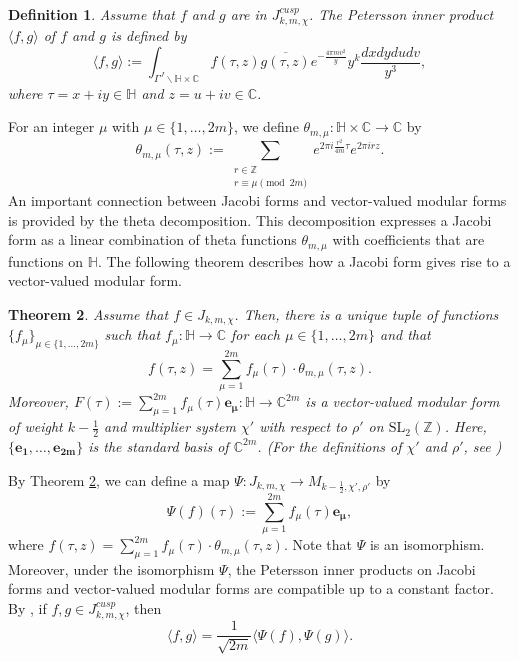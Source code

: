 \documentclass[11pt]{amsart}
\newtheorem{thm}{Theorem}[section]
\newtheorem{dfn}[thm]{Definition}
\theoremstyle{definition}
\theoremstyle{remark}
\numberwithin{equation}{section}
\renewcommand{\(}{\left(}
\renewcommand{\)}{\right)}
\def\ZZ{\mathbb{Z}}
\begin{document}
\begin{dfn}\label{def : def of Petersson inner product Jacobi}
Assume that $f$ and $g$ are in $J^{cusp}_{k,m,\chi}$. 
The Petersson inner product $\langle f, g \rangle$ of $f$ and $g$ is defined by 
\[ \langle f , g \rangle := \int_{\Gamma^{J}\backslash \mathbb{H}\times \mathbb{C}} f(\tau,z)\overline{g(\tau,z)} e^{-\frac{4\pi m v^2}{y}}y^{k} \frac{dxdydudv}{y^3},  \]
where $\tau=x+iy\in \mathbb{H}$ and $z=u+iv\in \mathbb{C}$. 
\end{dfn}

For an integer $\mu$ with $\mu\in \{1,\dots, 2m\}$, we define $\theta_{m,\mu}:\mathbb{H}\times \mathbb{C}\to \mathbb{C}$ by 
\[ \theta_{m,\mu}(\tau,z):=\sum_{\substack{r\in \ZZ \\ r\equiv \mu \pmod{2m}}} e^{2\pi i \frac{r^2}{4m}\tau} e^{2\pi i r z}.\]
An important connection between Jacobi forms and vector-valued modular forms is provided by the theta decomposition.
This decomposition expresses a Jacobi form as a linear combination of theta functions $\theta_{m,\mu}$ with coefficients that are functions on $\mathbb{H}$.
The following theorem describes how a Jacobi form gives rise to a vector-valued modular form.


\begin{thm}\label{thm 5}\cite[Section 5]{EZ1}
    Assume that $f\in J_{k,m,\chi}$. 
    Then, there is a unique tuple of functions $\{f_{\mu}\}_{\mu\in \{1,\dots, 2m\}}$ such that $f_{\mu} : \mathbb{H}\to \mathbb{C}$ for each $\mu\in \{1,\dots, 2m\}$ and that 
    \[ f(\tau,z)=\sum_{\mu=1}^{2m} f_{\mu}(\tau) \cdot \theta_{m,\mu}(\tau,z). \]
    Moreover, $F(\tau):=\sum_{\mu=1}^{2m} f_{\mu}(\tau) \mathbf{e_{\mu}} : \mathbb{H}\to \mathbb{C}^{2m}$ is a vector-valued modular form of weight $k-\frac{1}{2}$ and multiplier system $\chi'$ with respect to $\rho'$ on $\mathrm{SL}_{2}(\mathbb{Z})$. 
    Here, $\{\mathbf{e_1},\dots, \mathbf{e_{2m}}\}$ is the standard basis of $\mathbb{C}^{2m}$.
    (For the definitions of $\chi'$ and $\rho'$, see \cite[Section 2]{CL})
\end{thm}

By Theorem \ref{thm 5}, we can define a map $\Psi:J_{k,m,\chi}\to M_{k-\frac{1}{2},\chi',\rho'}$ by
\[ \Psi(f)(\tau):=\sum_{\mu=1}^{2m} f_{\mu}(\tau) \mathbf{e_{\mu}}, \]
where $f(\tau,z)=\sum_{\mu=1}^{2m}f_{\mu}(\tau)\cdot \theta_{m,\mu}(\tau,z)$.
Note that $\Psi$ is an isomorphism.
Moreover, under the isomorphism $\Psi$, the Petersson inner products on Jacobi forms and vector-valued modular forms are compatible up to a constant factor.  
By \cite[Theorem 5.3]{EZ1}, if $f,g\in J^{cusp}_{k,m,\chi}$, then 
\[ \langle f,g \rangle = \frac{1}{\sqrt{2m}} \langle  \Psi(f), \Psi(g) \rangle.  \]
\end{document}

